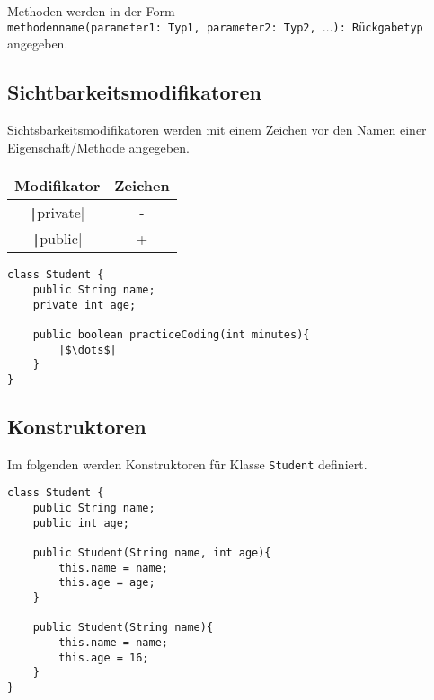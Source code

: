 \documentclass[a4paper]{scrartcl}
\begin{document}
\noindent
Methoden werden in der Form \\ \texttt{methodenname(parameter1: Typ1, parameter2: Typ2, $\dots$): Rückgabetyp}\\ angegeben.



\subsection*{Sichtbarkeitsmodifikatoren}

Sichtsbarkeitsmodifikatoren werden mit einem Zeichen vor den Namen einer Eigenschaft/Methode angegeben.

\begin{center}
\begin{tabular}{cc}
\hline
Modifikator & Zeichen  \\
\hline
\texttt|private| & -  \\
\texttt|public| & +  \\
\hline
\end{tabular}

\end{center}

\begin{verbatim}
class Student {
    public String name;
    private int age;
	   
    public boolean practiceCoding(int minutes){
	    |$\dots$|
    }
}
\end{verbatim}


\begin{center}
\end{center}


\subsection*{Konstruktoren}

Im folgenden werden Konstruktoren für Klasse \texttt{Student} definiert.

\begin{verbatim}
class Student {
    public String name;
    public int age;

    public Student(String name, int age){
        this.name = name;
        this.age = age;
    }

    public Student(String name){
        this.name = name;
        this.age = 16;
    }
}
\end{verbatim}
\end{document}
